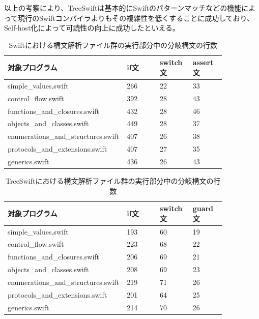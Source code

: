 以上の考察により、TreeSwiftは基本的にSwiftのパターンマッチなどの機能によって現行のSwiftコンパイラよりもその複雑性を低くすることに成功しており、Self-host化によって可読性の向上に成功したといえる。

\begin{table}[!hbtp]
    \begin{center}
        \caption{Swiftにおける構文解析ファイル群の実行部分中の分岐構文の行数}
        \begin{tabular}{|p{0.4\linewidth}|p{0.15\linewidth}|p{0.15\linewidth}|p{0.15\linewidth}|}
            \hline
            対象プログラム & if文 & switch文 & assert文\\
            \hline
            \hline
            simple\_values.swift & 266 & 22 & 33\\
            \hline
            control\_flow.swift & 392 & 28 & 43\\
            \hline
            functions\_and\_closures.swift & 432 & 28 & 46\\
            \hline
            objects\_and\_classes.swift & 449 & 28 & 37\\
            \hline
            enumerations\_and\_structures.swift & 407 & 26 & 38\\
            \hline
            protocols\_and\_extensions.swift & 407 & 27 & 35\\
            \hline
            generics.swift & 436 & 26 & 43\\
            \hline
        \end{tabular}
        \label{table:branching-method-swift}
    \end{center}
\end{table}

\begin{table}[!hbtp]
    \begin{center}
        \caption{TreeSwiftにおける構文解析ファイル群の実行部分中の分岐構文の行数}
        \begin{tabular}{|p{0.4\linewidth}|p{0.15\linewidth}|p{0.15\linewidth}|p{0.15\linewidth}|}
            \hline
            対象プログラム & if文 & switch文 & guard文\\
            \hline
            \hline
            simple\_values.swift & 193 & 60 & 19\\
            \hline
            control\_flow.swift & 223 & 68 & 22\\
            \hline
            functions\_and\_closures.swift & 206 & 69 & 21\\
            \hline
            objects\_and\_classes.swift & 208 & 69 & 23\\
            \hline
            enumerations\_and\_structures.swift & 219 & 71 & 26\\
            \hline
            protocols\_and\_extensions.swift & 201 & 64 & 25\\
            \hline
            generics.swift & 214 & 70 & 26\\
            \hline
        \end{tabular}
        \label{table:branching-method-treeswift}
    \end{center}
\end{table}

